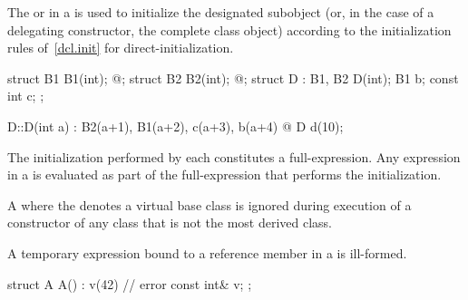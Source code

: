 \pnum
{}%
%
The
or 
in a
is used to initialize the
designated subobject (or, in the case of a delegating constructor, the complete class object)
according to the initialization rules of~\ref{dcl.init} for direct-initialization.
\begin{example}
\begin{codeblock}
struct B1 { B1(int); @\commentellip@ };
struct B2 { B2(int); @\commentellip@ };
struct D : B1, B2 {
  D(int);
  B1 b;
  const int c;
};

D::D(int a) : B2(a+1), B1(a+2), c(a+3), b(a+4) { @\commentellip@ }
D d(10);
\end{codeblock}
\end{example}
\begin{note}
\setlength{\emergencystretch}{1em}
The initialization
performed by each 
constitutes a full-expres\-sion.
Any expression in
a
is evaluated as part of the full-expression that performs the initialization.
\end{note}
A  where the  denotes
a virtual base class is ignored during execution of a constructor of any class that is
not the most derived class.

\pnum
A temporary expression bound to a reference member in a 
is ill-formed.
\begin{example}
\begin{codeblock}
struct A {
  A() : v(42) { }   // error
  const int& v;
};
\end{codeblock}
\end{example}

